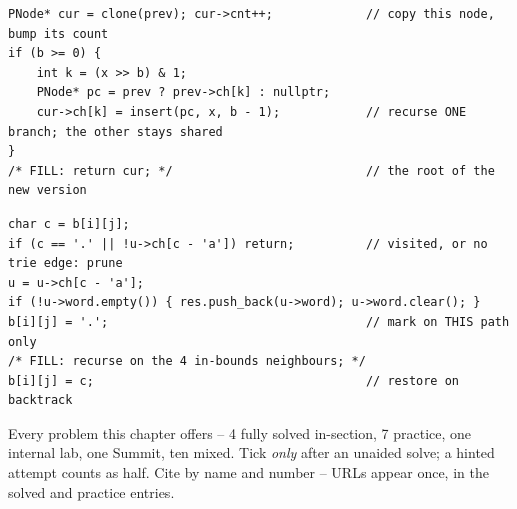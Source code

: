 \begin{lstlisting}[caption={Drill 4 -- persistent path-copy insert (from \coderef{c08-persist})}]
PNode* cur = clone(prev); cur->cnt++;             // copy this node, bump its count
if (b >= 0) {
    int k = (x >> b) & 1;
    PNode* pc = prev ? prev->ch[k] : nullptr;
    cur->ch[k] = insert(pc, x, b - 1);            // recurse ONE branch; the other stays shared
}
/* FILL: return cur; */                           // the root of the new version
\end{lstlisting}

\begin{lstlisting}[caption={Drill 5 -- Word Search II mark / restore around the grid DFS (from \coderef{c08-wordsearch-soln})}]
char c = b[i][j];
if (c == '.' || !u->ch[c - 'a']) return;          // visited, or no trie edge: prune
u = u->ch[c - 'a'];
if (!u->word.empty()) { res.push_back(u->word); u->word.clear(); }
b[i][j] = '.';                                    // mark on THIS path only
/* FILL: recurse on the 4 in-bounds neighbours; */
b[i][j] = c;                                      // restore on backtrack
\end{lstlisting}


Every problem this chapter offers -- 4 fully solved in-section, 7 practice, one internal lab, one Summit,
ten mixed. Tick \emph{only} after an unaided solve; a hinted attempt counts as half. Cite by name and
number -- URLs appear once, in the solved and practice entries.

